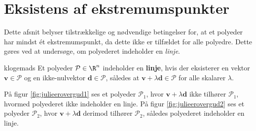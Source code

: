 \section{Eksistens af ekstremumspunkter}
%
Dette afsnit belyser tilstrækkelige og nødvendige betingelser for, at et polyeder har mindst ét ekstremumspunkt, da dette ikke er tilfældet for alle polyedre. 
Dette gøres ved at undersøge, om polyederet indeholder en \textit{linje}.
%
\begin{defn}{}{klogemads}
Et polyeder $\mathcal{P} \in \R^n$ indeholder en \textbf{linje}, hvis der eksisterer en vektor $\textbf{v} \in \mathcal{P}$ og en ikke-nulvektor $\textbf{d} \in \mathcal{P}$, således at $\textbf{v} + \lambda \textbf{d} \in \mathcal{P}$ for alle skalarer $\lambda$.
\end{defn}
\noindent
%
På figur \ref{fig:julieerovergud1} ses et polyeder $\mathcal{P}_1$, hvor $\mathbf{v} + \lambda \mathbf{d}$ ikke tilhører $\mathcal{P}_1$, hvormed polyederet ikke indeholder en linje. 
På figur \ref{fig:julieerovergud2} ses et polyeder $\mathcal{P}_2$, hvor $\mathbf{v} + \lambda \mathbf{d}$ derimod tilhører $\mathcal{P}_2$, således polyederet indeholder en linje.
\\\\
